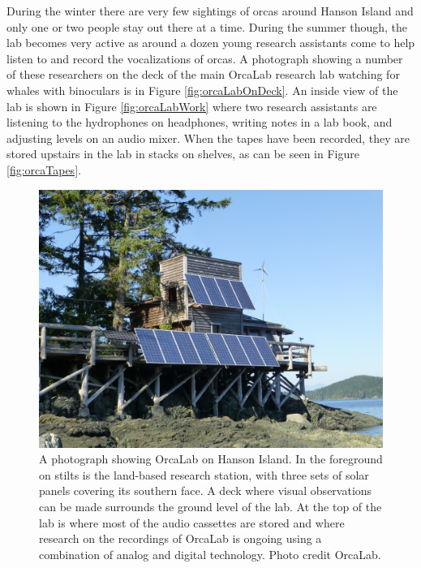 \documentclass[12pt,oneside]{book}
\begin{document}
During the winter there are very few sightings of orcas around Hanson
Island and only one or two people stay out there at a time.  During
the summer though, the lab becomes very active as around a dozen young
research assistants come to help listen to and record the
vocalizations of orcas.  A photograph showing a number of these
researchers on the deck of the main OrcaLab research lab watching for
whales with binoculars is in Figure \ref{fig:orcaLabOnDeck}.  An
inside view of the lab is shown in Figure \ref{fig:orcaLabWork} where
two research assistants are listening to the hydrophones on
headphones, writing notes in a lab book, and adjusting levels on an
audio mixer.  When the tapes have been recorded, they are stored
upstairs in the lab in stacks on shelves, as can be seen in Figure
\ref{fig:orcaTapes}.

\begin{figure}[t]
\centering
\includegraphics[width=\columnwidth]{figures/orcaLab}
\caption{A photograph showing OrcaLab on Hanson Island.  In the
  foreground on stilts is the land-based research station, with three
  sets of solar panels covering its southern face.  A deck where
  visual observations can be made surrounds the ground level of the
  lab.  At the top of the lab is where most of the audio cassettes are
  stored and where research on the recordings of OrcaLab is ongoing
  using a combination of analog and digital technology. Photo credit OrcaLab.}
\label{fig:orcaLab}
\end{figure}
\end{document}
